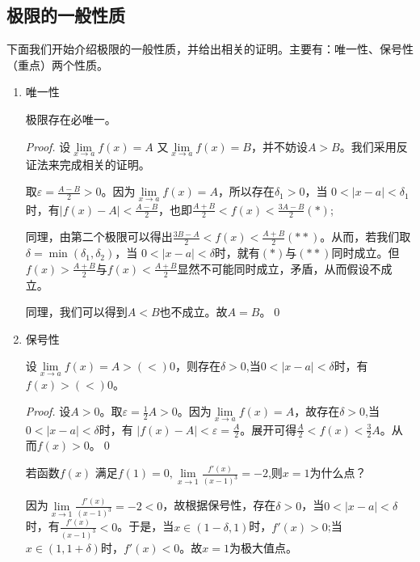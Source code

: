 \subsection{极限的一般性质}
下面我们开始介绍极限的一般性质，并给出相关的证明。主要有：唯一性、保号性（重点）两个性质。
\begin{enumerate}
    \item 唯一性
    \begin{property}
        极限存在必唯一。
    \end{property}
    
    \begin{proof}
    设$\lim\limits_{x \to a}f(x)=A $
    又$ \lim\limits_{x \to a}f(x)=B $，并不妨设$A>B$。我们采用反证法来完成相关的证明。
    
    取$ \varepsilon=\displaystyle\frac{A-B}{2}>0 $。因为$\lim\limits_{x \to a}f(x)=A $，所以存在$\delta_1>0 $，当 $0<\vert x-a\vert <\delta_1 $时，有$\vert{f(x)-A}\vert<\displaystyle\frac{A-B}{2}$，也即$\displaystyle\frac{A+B}{2}<f(x)<\frac{3A-B}{2}(*)$; 
    
    
    同理，由第二个极限可以得出$\displaystyle\frac{3B-A}{2}<f(x)<\displaystyle\frac{A+B}{2}(**)$。从而，若我们取$\delta=\min{(\delta_1,\delta_2)}$，当
    $ 0<\vert x-a\vert <\delta $时，就有$(*)$与$(**)$同时成立。但$f(x)>\displaystyle\frac{A+B}{2}$与$f(x)<\displaystyle\frac{A+B}{2}$显然不可能同时成立，矛盾，从而假设不成立。
    
    同理，我们可以得到$A<B$也不成立。故$A=B$。\qed
    \end{proof} 
    
    \item \FiveStar 保号性
    \begin{property}
        设$\lim\limits_{x \to a}f(x)=A>(<)0$，则存在$ \delta>0 $,当$ 0<\vert x-a\vert <\delta $时，有$f(x)>(<)0$。
    \end{property}
    \begin{proof}
        设$A>0$。取$\varepsilon=\displaystyle\frac{1}{2}A>0$。因为$\lim\limits_{x \to a}f(x)=A$，故存在$ \delta>0 $,当$ 0<\vert x-a\vert <\delta $时，有 $\vert{f(x)-A}\vert<\varepsilon=\displaystyle\frac{A}{2}$。展开可得$\displaystyle\frac{A}{2}<f(x)<\displaystyle\frac{3}{2}A$。从而$f(x)>0$。\qed
    \end{proof}
    \begin{example}
       若函数$ f(x) $ 满足$ f(1)=0, \lim\limits_{x \to 1} \displaystyle\frac{f'(x)}{(x-1)^3}=-2 $,则$ x=1 $为什么点？
    \end{example}
    \begin{solution}
        因为$\lim\limits_{x \to 1}\displaystyle\frac{f'(x)}{(x-1)^3}=-2<0$，故根据保号性，存在$ \delta>0 $，当$ 0<\vert x-a\vert <\delta $时，有$\displaystyle\frac{f'(x)}{(x-1)^3}<0$。于是，当$x \in (1-\delta,1)$时，$f'(x)>0$;当$x \in (1,1+\delta)$时，$f'(x)<0$。故$x=1$为极大值点。
    \end{solution}
\end{enumerate}

